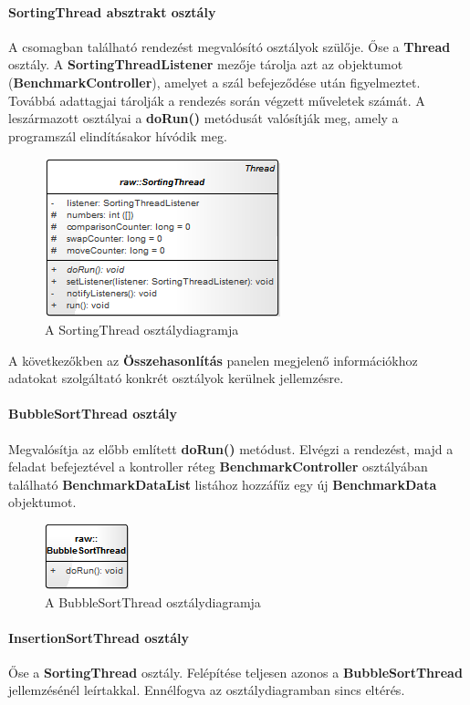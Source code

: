 \documentclass{elteikthesis}
\begin{document}
\paragraph{SortingThread absztrakt osztály}
A csomagban található rendezést megvalósító osztályok szülője. Őse a \textbf{Thread} osztály. A \textbf{SortingThreadListener} mezője tárolja azt az objektumot (\textbf{BenchmarkController}), amelyet a szál befejeződése után figyelmeztet. Továbbá adattagjai tárolják a rendezés során végzett műveletek számát.
A leszármazott osztályai a \textbf{doRun()} metódusát valósítják meg, amely a programszál elindításakor hívódik meg. 
\begin{figure}[H]
	\centering
	\includegraphics{pics/class/SortingThread.png}
	\caption{A SortingThread osztálydiagramja}
\end{figure}
A következőkben az \textbf{Összehasonlítás} panelen megjelenő információkhoz adatokat szolgáltató konkrét osztályok kerülnek jellemzésre.
\paragraph{BubbleSortThread osztály}
Megvalósítja az előbb említett \textbf{doRun()} metódust. Elvégzi a rendezést, majd a feladat befejeztével a kontroller réteg \textbf{BenchmarkController} osztályában található \textbf{BenchmarkDataList} listához hozzáfűz egy új \textbf{BenchmarkData} objektumot.
\begin{figure}[H]
	\centering
	\includegraphics{pics/class/BubbleSortThread.png}
	\caption{A BubbleSortThread osztálydiagramja}
\end{figure}
\paragraph{InsertionSortThread osztály}
Őse a \textbf{SortingThread} osztály. Felépítése teljesen azonos a \textbf{BubbleSortThread} jellemzésénél leírtakkal. Ennélfogva az osztálydiagramban sincs eltérés.
\end{document}
